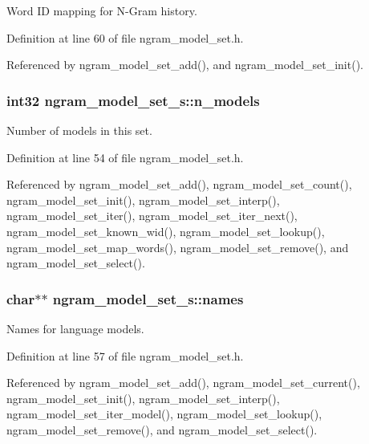 Word I\-D mapping for N-\/\-Gram history. 



Definition at line 60 of file ngram\-\_\-model\-\_\-set.\-h.



Referenced by ngram\-\_\-model\-\_\-set\-\_\-add(), and ngram\-\_\-model\-\_\-set\-\_\-init().

\subsubsection[{n\-\_\-models}]{\setlength{\rightskip}{0pt plus 5cm}int32 ngram\-\_\-model\-\_\-set\-\_\-s\-::n\-\_\-models}\label{structngram__model__set__s_a6c28858d5631a9c9dbc7b2c9583f5c5a}


Number of models in this set. 



Definition at line 54 of file ngram\-\_\-model\-\_\-set.\-h.



Referenced by ngram\-\_\-model\-\_\-set\-\_\-add(), ngram\-\_\-model\-\_\-set\-\_\-count(), ngram\-\_\-model\-\_\-set\-\_\-init(), ngram\-\_\-model\-\_\-set\-\_\-interp(), ngram\-\_\-model\-\_\-set\-\_\-iter(), ngram\-\_\-model\-\_\-set\-\_\-iter\-\_\-next(), ngram\-\_\-model\-\_\-set\-\_\-known\-\_\-wid(), ngram\-\_\-model\-\_\-set\-\_\-lookup(), ngram\-\_\-model\-\_\-set\-\_\-map\-\_\-words(), ngram\-\_\-model\-\_\-set\-\_\-remove(), and ngram\-\_\-model\-\_\-set\-\_\-select().

\subsubsection[{names}]{\setlength{\rightskip}{0pt plus 5cm}char$\ast$$\ast$ ngram\-\_\-model\-\_\-set\-\_\-s\-::names}\label{structngram__model__set__s_aff5e13c45decde4c5bf30d8aa2b1c7d9}


Names for language models. 



Definition at line 57 of file ngram\-\_\-model\-\_\-set.\-h.



Referenced by ngram\-\_\-model\-\_\-set\-\_\-add(), ngram\-\_\-model\-\_\-set\-\_\-current(), ngram\-\_\-model\-\_\-set\-\_\-init(), ngram\-\_\-model\-\_\-set\-\_\-interp(), ngram\-\_\-model\-\_\-set\-\_\-iter\-\_\-model(), ngram\-\_\-model\-\_\-set\-\_\-lookup(), ngram\-\_\-model\-\_\-set\-\_\-remove(), and ngram\-\_\-model\-\_\-set\-\_\-select().

